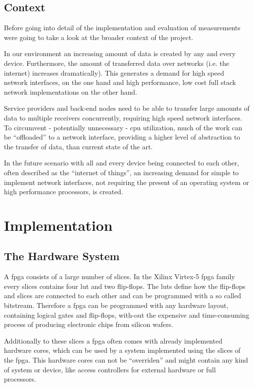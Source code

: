 \section{Context}

Before going into detail of the implementation and evaluation of measurements were going to take a look at the broader context of the project.

In our environment an increasing amount of data is created by any and every device. Furthermore, the amount of transferred data over networks (i.e. the internet) increases dramatically). This generates a demand for high speed network interfaces, on the one hand and high performance, low cost full stack network implementations on the other hand. 

Service providers and back-end nodes need to be able to transfer large amounts of data to multiple receivers concurrently, requiring high speed network interfaces. To circumvent - potentially unnecessary - \gls{cpu} utilization, much of the work can be "`offloaded"' to a network interface, providing a higher level of abstraction to the transfer of data, than current state of the art.

In the future scenario with all and every device being connected to each other, often described as the "`internet of things"', an increasing demand for simple to implement network interfaces, not requiring the present of an operating system or high performance processors, is created. 

\chapter{Implementation}

\section{The Hardware System}

A \gls{fpga} consists of a large number of slices. In the Xilinx Virtex-5 \gls{fpga} family every slices contains four \gls{lut} and two flip-flops. The \gls{lut}s define how the flip-flops and slices are connected to each other and can be programmed with a so called bitstream. Therefore a \gls{fpga} can be programmed with any  hardware layout, containing logical gates and flip-flops, with-out the expensive and time-consuming process of producing electronic chips from silicon wafers.

Additionally to these slices a \gls{fpga} often comes with already implemented hardware cores, which can be used by a system implemented using the slices of the \gls{fpga}. This hardware cores can not be "`overriden"' and might contain any kind of system or device, like access controllers for external hardware or full processors.


